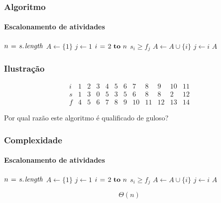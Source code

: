 \documentclass{beamer}
\begin{document}
\begin{frame}
\frametitle{Algoritmo}
\framesubtitle{Escalonamento de atividades}

\begin{codebox}
\zi {}
\li $n \gets \attrib{s}{length}$
\zi {}
\li $A \gets \{ 1 \}$  
\zi {}
\li $j \gets 1$
\li \For $i \gets 2 \To n$ 
\li \Do \If $s_i \ge f_j$
\li   \Then $A \gets A \cup \{ i \}$
\li     $j \gets i$
      \End
    \End
\li \Return $A$
\end{codebox}

\end{frame}


\begin{frame}
\frametitle{Ilustração}

$$
\begin{array}{|c|c|c|c|c|c|c|c|c|c|c|c|}
i & 1 & 2 & 3 & 4 & 5 & 6 & 7 & 8 & 9 & 10 & 11 \\
\hline
\hline
s & 1 & 3 & 0 & 5 & 3 & 5 & 6 & 8 & 8 & 2 & 12 \\
\hline
f & 4 & 5 & 6 & 7 & 8 & 9 & 10 & 11 & 12 & 13 & 14
\end{array}
$$

\pause
Por qual razão este algoritmo é qualificado de \alert{guloso}?

\end{frame}



\begin{frame}
\frametitle{Complexidade}
\framesubtitle{Escalonamento de atividades}

\begin{codebox}
\li $n \gets \attrib{s}{length}$
\li $A \gets \{ 1 \}$
\li $j \gets 1$
\li \For $i \gets 2 \To n$ 
\li \Do \If $s_i \ge f_j$ 
\li   \Then $A \gets A \cup \{ i \}$
\li     $j \gets i$
      \End
    \End
\li \Return $A$
\end{codebox}
\pause
\alert{$$\Theta(n)$$}
\end{frame}

\end{document}
